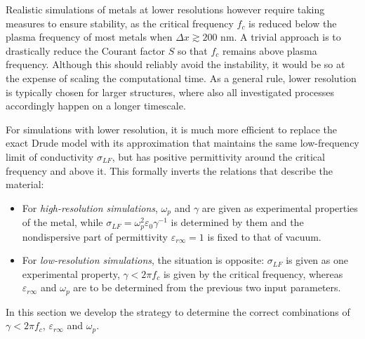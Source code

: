 Realistic simulations of metals at lower resolutions however require taking measures to ensure stability, as the critical frequency $f_c$ is reduced below the plasma frequency of most metals when $\Delta x \gtrsim 200$ nm. %
A trivial approach is to drastically reduce the Courant factor $S$ so that $f_c$ remains above plasma frequency. Although this should reliably avoid the instability, it would be so at the expense of scaling the computational time. As a general rule, lower resolution is typically chosen for larger structures, where also all investigated processes accordingly happen on a longer timescale.

For simulations with lower resolution, it is much more efficient to replace the exact Drude model with its approximation that maintains the same low-frequency limit of conductivity $\sigma_{LF}$, but has positive permittivity around the critical frequency and above it. 
This formally inverts the relations that describe the material:
\begin{itemize}
\item{
For \textit{high-resolution simulations}, $\omega_p$ and $\gamma$ are given as experimental properties of the metal, while $\sigma_{LF} = \omega_p^2\varepsilon_0\gamma^{-1}$ is determined by them and the nondispersive part of permittivity $\varepsilon_{r\infty} = 1$ is fixed to that of vacuum. 
} 
\item{
For \textit{low-resolution simulations}, the situation is opposite: $\sigma_{LF}$ is given as one experimental property, $\gamma < 2\pi f_c$ is given by the critical frequency, %
whereas $\varepsilon_{r\infty}$ and $\omega_p$ are to be determined from the previous two input parameters.
} 
\end{itemize}
In this section we develop the strategy to determine the correct combinations of  $\gamma < 2\pi f_c$, $\varepsilon_{r\infty}$ and $\omega_p$.

